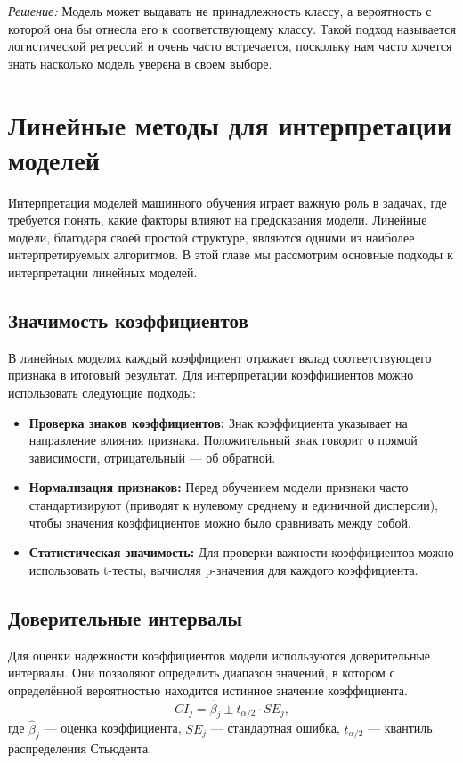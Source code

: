 \textit{Решение:} Модель может выдавать не принадлежность классу, а вероятность с которой она бы отнесла его к соответствующему классу. Такой подход называется логистической регрессий и очень часто встречается, поскольку нам часто хочется знать насколько модель уверена в своем выборе.


\section{Линейные методы для интерпретации моделей}

Интерпретация моделей машинного обучения играет важную роль в задачах, где требуется понять, какие факторы влияют на предсказания модели. Линейные модели, благодаря своей простой структуре, являются одними из наиболее интерпретируемых алгоритмов. В этой главе мы рассмотрим основные подходы к интерпретации линейных моделей.

\subsection*{Значимость коэффициентов}
В линейных моделях каждый коэффициент отражает вклад соответствующего признака в итоговый результат. Для интерпретации коэффициентов можно использовать следующие подходы:
\begin{itemize}
    \item \textbf{Проверка знаков коэффициентов:} Знак коэффициента указывает на направление влияния признака. Положительный знак говорит о прямой зависимости, отрицательный --- об обратной.
    \item \textbf{Нормализация признаков:} Перед обучением модели признаки часто стандартизируют (приводят к нулевому среднему и единичной дисперсии), чтобы значения коэффициентов можно было сравнивать между собой.
    \item \textbf{Статистическая значимость:} Для проверки важности коэффициентов можно использовать t-тесты, вычисляя p-значения для каждого коэффициента.
\end{itemize}

\subsection*{Доверительные интервалы}
Для оценки надежности коэффициентов модели используются доверительные интервалы. Они позволяют определить диапазон значений, в котором с определённой вероятностью находится истинное значение коэффициента.
\[
CI_j = \hat{\beta}_j \pm t_{\alpha/2} \cdot SE_j,
\]
где $\hat{\beta}_j$ --- оценка коэффициента, $SE_j$ --- стандартная ошибка, $t_{\alpha/2}$ --- квантиль распределения Стьюдента.

